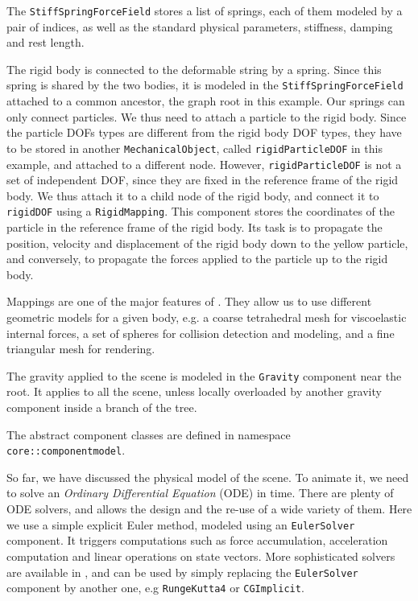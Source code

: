 The \texttt{StiffSpringForceField} stores a list of springs, each of them modeled by a pair of indices, as well as the standard physical parameters, stiffness, damping and rest length.

The rigid body is connected to the deformable string by a spring.
Since this spring is shared by the two bodies, it is modeled in the \texttt{StiffSpringForceField} attached to a common ancestor, the graph root in this example.
Our springs can only connect particles. 
We thus need to attach a particle to the rigid body. 
Since the particle DOFs types are different from the rigid body DOF types, they have to be stored in another \texttt{MechanicalObject}, called \texttt{rigidParticleDOF} in this example, and attached to a different node.
However, \texttt{rigidParticleDOF} is not a set of independent DOF, since they are fixed in the reference frame of the rigid body. We thus attach it to a child node of the rigid body, and connect it to \texttt{rigidDOF} using a \texttt{RigidMapping}. 
This component stores the coordinates of the particle in the reference frame of the rigid body. 
Its task is to propagate the position, velocity and displacement of the rigid body down to the yellow particle, and conversely, to propagate the forces applied to the particle up to the rigid body.

Mappings are one of the major features of \sofa. 
They allow us to use different geometric models for a given body, e.g. a coarse tetrahedral mesh for viscoelastic internal forces, a set of spheres for collision detection and modeling, and a fine triangular mesh for rendering.

The gravity applied to the scene is modeled in the \texttt{Gravity} component near the root. 
It applies to all the scene, unless locally overloaded by another gravity component inside a branch of the tree.

The abstract component classes are defined in namespace \texttt{core::componentmodel}.

So far, we have discussed the physical model of the scene.
To animate it, we need to solve an \textit{Ordinary Differential Equation} (ODE) in time.
There are plenty of ODE solvers, and \sofa allows the design and the re-use of a wide variety of them.
Here we use a simple explicit Euler method, modeled using an \texttt{EulerSolver} component.
It triggers computations such as force accumulation, acceleration computation and linear operations on state vectors.
More sophisticated solvers are available in \sofa, and can be used by simply replacing the  \texttt{EulerSolver} component by another one, e.g \texttt{RungeKutta4} or \texttt{CGImplicit}.

